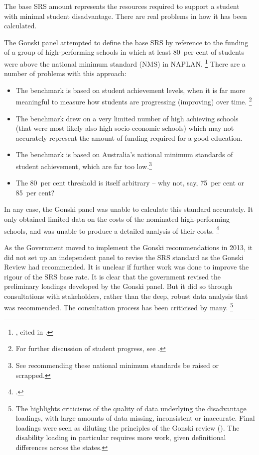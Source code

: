 \documentclass{grattan}
\begin{document}
The base SRS amount represents the resources required to support a student with minimal student disadvantage. There are real problems in how it has been calculated.


The Gonski panel attempted to define the base SRS by reference to the funding of a group of high-performing schools in which at least 80~per cent of students were above the national minimum standard (NMS) in NAPLAN.%
\footnote{\textcite{Justman2013WhatsWrongGonski}, cited in \textcite{SenBackn.d.GovernmentSenatorsDissenting}.}
There are a number of problems with this approach:

\begin{itemize}[itemsep=1.2ex]
\item The benchmark is based on student achievement levels, when it is far more meaningful to measure how students are progressing (improving) over time.%
\footnote{For further discussion of student progress, see \textcites{Goss-2016-Widening-gaps-NAPLAN}{Jensen2010MeasuringWhatMatters}.}
\item The benchmark drew on a very limited number of high achieving schools (that were most likely also high socio-economic schools) which may not accurately represent the amount of funding required for a good education.
\item The benchmark is based on Australia's national minimum standards of student achievement, which are far too low.\footnote{See \textcite{Goss-2016-Widening-gaps-NAPLAN}  recommending these national minimum standards be raised or scrapped.}
\item The 80~per cent threshold is itself arbitrary -- why not, say, 75~per cent or 85~per cent?
\end{itemize}

In any case, the Gonski panel was unable to calculate this standard accurately. It only obtained limited data on the costs of the nominated high-performing schools, and was unable to produce a detailed analysis of their costs.%
\footnote{\textcite{NCA2014TowardsResponsibleGovernment}.}

As the Government moved to implement the Gonski recommendations in 2013, it did not set up an independent panel to revise the SRS standard as the Gonski Review had recommended. It is unclear if further work was done to improve the rigour of the SRS base rate. It is clear that the government revised the preliminary loadings developed by the Gonski panel. But it did so through consultations with stakeholders, rather than the deep, robust data analysis that was recommended. The consultation process has been criticised by many.%
\footnote{The \textcite{NCA2014TowardsResponsibleGovernment} highlights criticisms of the quality of data underlying the disadvantage loadings, with large amounts of data missing, inconsistent or inaccurate. Final loadings were seen as diluting the principles of the Gonski review (\textcite[][42]{Connors2015ImperativesSchoolsFunding}).
The disability loading in particular requires more work, given definitional differences across the states.}
\end{document}
